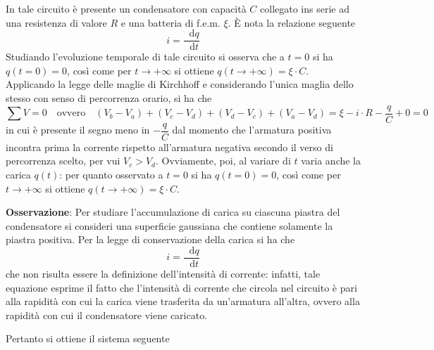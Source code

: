 \documentclass[a4paper]{extarticle}
\newcommand\dif{\mathop{}\!\mathrm{d}}
\begin{document}
\vspace{1em}
\noindent
In tale circuito è presente un condensatore con capacità $C$ collegato ins serie ad una resistenza di valore $R$ e una batteria di f.e.m. $\xi$. È nota la relazione seguente
\[i=\dfrac{\dif q}{\dif t}\]
Studiando l'evoluzione temporale di tale circuito si osserva che a $t=0$ si ha $q(t=0) = 0$, così come per $t \to +\infty$ si ottiene $q(t \to +\infty) = \xi \cdot C$.\\
Applicando la legge delle maglie di Kirchhoff e considerando l'unica maglia dello stesso con senso di percorrenza orario, si ha che
\[\sum V = 0 \hspace{1em} \text{ovvero} \hspace{1em} (V_b-V_a)+(V_c-V_d)+(V_d-V_c)+(V_a-V_d) = \xi - i \cdot R - \dfrac{q}{C} + 0=0\]
in cui è presente il segno meno in $- \dfrac{q}{C}$ dal momento che l'armatura positiva incontra prima la corrente rispetto all'armatura negativa secondo il verso di percorrenza scelto, per vui $V_c > V_d$. Ovviamente, poi, al variare di $t$ varia anche la carica $q(t)$: per quanto osservato a $t=0$ si ha $q(t=0) = 0$, così come per $t \to +\infty$ si ottiene $q(t \to +\infty) = \xi \cdot C$.

\vspace{1em}
\noindent
\textbf{Osservazione}: Per studiare l'accumulazione di carica su ciascuna piastra del condensatore si consideri una superficie gaussiana che contiene solamente la piastra positiva. Per la legge di conservazione della carica si ha che
\[\boxed{i=\dfrac{\dif q}{\dif t}}\]
che non risulta essere la definizione dell'intensità di corrente: infatti, tale equazione esprime il fatto che l'intensità di corrente che circola nel circuito è pari alla rapidità con cui la carica viene trasferita da un'armatura all'altra, ovvero alla rapidità con cui il condensatore viene caricato.

\vspace{1em}
\noindent
Pertanto si ottiene il sistema seguente
\end{document}
